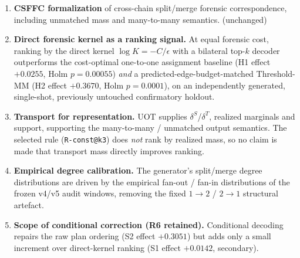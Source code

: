 \begin{enumerate}
  \item \textbf{CSFFC formalization} of cross-chain split/merge forensic correspondence,
        including unmatched mass and many-to-many semantics. (unchanged)
  \item \textbf{Direct forensic kernel as a ranking signal.} At equal forensic cost, ranking
        by the direct kernel $\log K = -C/\epsilon$ with a bilateral top-$k$ decoder
        outperforms the cost-optimal one-to-one assignment baseline
        (H1 effect $+0.0255$, Holm $p = 0.00055$) \emph{and}
        a predicted-edge-budget-matched Threshold-MM
        (H2 effect $+0.3670$, Holm $p = 0.0001$), on an
        independently generated, single-shot, previously untouched confirmatory holdout.
  \item \textbf{Transport for representation.} UOT supplies $\delta^S$/$\delta^T$,
        realized marginals and support, supporting the many-to-many / unmatched output
        semantics. The selected rule (\texttt{R-const@k3}) does \emph{not} rank by
        realized mass, so no claim is made that transport mass directly improves ranking.
  \item \textbf{Empirical degree calibration.} The generator's split/merge degree
        distributions are driven by the empirical fan-out / fan-in distributions of the
        frozen v4/v5 audit windows, removing the fixed $1\!\to\!2$ / $2\!\to\!1$ structural
        artefact.
  \item \textbf{Scope of conditional correction (R6 retained).} Conditional decoding repairs
        the raw plan ordering (S2 effect $+0.3051$) but adds only a
        small increment over direct-kernel ranking (S1 effect
        $+0.0142$, secondary).
\end{enumerate}
